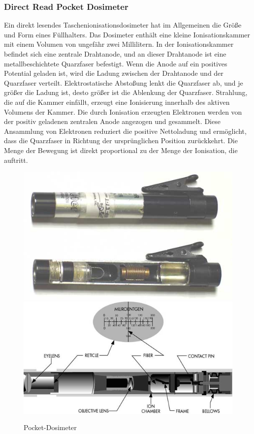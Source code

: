 {\subsubsection{Direct Read Pocket Dosimeter}
Ein direkt lesendes Taschenionisationsdosimeter hat im Allgemeinen die Größe und Form eines Füllhalters. Das Dosimeter enthält eine kleine Ionisationskammer mit einem Volumen von ungefähr zwei Millilitern. In der Ionisationskammer befindet sich eine zentrale Drahtanode, und an dieser Drahtanode ist eine metallbeschichtete Quarzfaser befestigt. Wenn die Anode auf ein positives Potential geladen ist, wird die Ladung zwischen der Drahtanode und der Quarzfaser verteilt. Elektrostatische Abstoßung lenkt die Quarzfaser ab, und je größer die Ladung ist, desto größer ist die Ablenkung der Quarzfaser. Strahlung, die auf die Kammer einfällt, erzeugt eine Ionisierung innerhalb des aktiven Volumens der Kammer. Die durch Ionisation erzeugten Elektronen werden von der positiv geladenen zentralen Anode angezogen und gesammelt. Diese Ansammlung von Elektronen reduziert die positive Nettoladung und ermöglicht, dass die Quarzfaser in Richtung der ursprünglichen Position zurückkehrt. Die Menge der Bewegung ist direkt proportional zu der Menge der Ionisation, die auftritt.
\begin{figure}[htb]
  \includegraphics[scale=0.3]{img/dosimeter&cutaway.jpg}
  \includegraphics[scale=0.3]{img/dose.png}
  \caption{Pocket-Dosimeter}
  \label{fig:Pocket-Dosimeter}
\end{figure}

}
